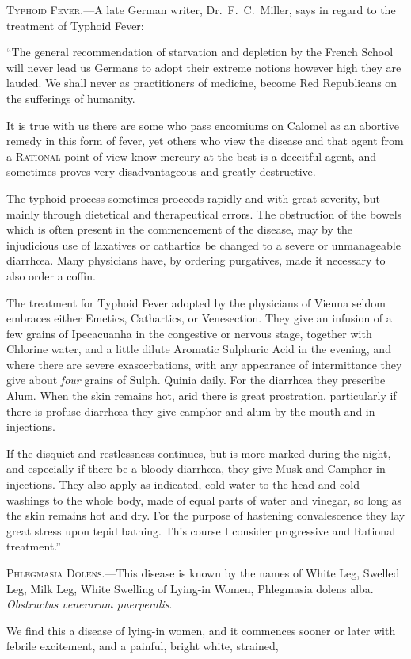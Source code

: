 
\textsc{Typhoid Fever}.---A late German writer, Dr.\ F.\ C.\ Miller, says in
regard to the treatment of Typhoid Fever:

``The general recommendation of starvation and depletion by the
French School will never lead us Germans to adopt their extreme notions
however high they are lauded. We shall never as practitioners of
medicine, become Red Republicans on the sufferings of humanity.

It is true with us there are some who pass encomiums on Calomel as an
abortive remedy in this form of fever, yet others who view the disease
and that agent from a \textsc{Rational} point of view know mercury at the
best is a deceitful agent, and sometimes proves very disadvantageous 
and greatly destructive. 

The typhoid process sometimes proceeds rapidly and with great
severity, but mainly through dietetical and therapeutical errors. The
obstruction of the bowels which is often present in the commencement
of the disease, may by the injudicious use of laxatives or cathartics
be changed to a severe or unmanageable diarrhœa. Many physicians
have, by ordering purgatives, made it necessary to also order a coffin.

The treatment for Typhoid Fever adopted by the physicians of
Vienna seldom embraces either Emetics, Cathartics, or Venesection.
They give an infusion of a few grains of Ipecacuanha in the congestive
or nervous stage, together with Chlorine water, and a little dilute
Aromatic Sulphuric Acid in the evening, and where there are severe
exascerbations, with any appearance of intermittance they give about
\emph{four} grains of Sulph. Quinia daily. For the diarrhœa they prescribe
Alum. When the skin remains  hot, arid there is great
prostration, particularly if there is profuse diarrhœa they give camphor
and alum by the mouth and in injections.

If the disquiet and restlessness continues, but is more marked during
the night, and especially if there be a bloody diarrhœa, they give
Musk and Camphor in injections. They also apply as indicated, cold
water to the head and cold washings to the whole body, made of equal
parts of water and vinegar, so long as the skin remains hot and dry.
For the purpose of hastening convalescence they lay great stress upon
tepid bathing. This course I consider progressive and Rational treatment.''

\textsc{Phlegmasia Dolens}.---This disease is known by the names of White
Leg, Swelled Leg, Milk Leg, White Swelling of Lying-in Women,
Phlegmasia dolens alba. \emph{Obstructus venerarum puerperalis}.

We find this a disease of lying-in women, and it commences sooner
or later with febrile excitement, and a painful, bright white, strained,\endinput
